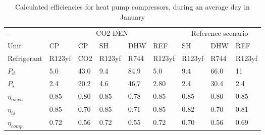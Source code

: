 \begin{table}[h!]
	\centering
	\caption{Calculated efficiencies for heat pump compressors, during an average day in January}\vspace{2mm}
	\label{tab:eta_comp} 
\begin{tabular}{l@{\hskip 0.5in}lllll@{\hskip 0.5in}lll} \toprule
	-             & \multicolumn{5}{c}{CO2 DEN}            & \multicolumn{3}{c}{Reference scenario} \\
	Unit          & CP     & CP   & SH     & DHW  & REF    & SH           & DHW       & REF         \\
	Refrigerant   & R123yf & CO2  & R123yf & R744 & R123yf & R123yf       & R744      & R123yf      \\ \midrule
	$P_{d}$       & 5.0    & 43.0 & 9.4    & 84.9 & 5.0    & 9.4          & 66.0      & 11          \\
	$P_{s}$       & 2.4    & 20.2 & 4.6    & 46.7 & 2.80   & 2.4          & 30.4      & 2.4         \\
	$\eta_{mech}$ & 0.85   & 0.80 & 0.85   & 0.78 & 0.85   & 0.85         & 0.80      & 0.85        \\
	$\eta_{is}$   & 0.85   & 0.70 & 0.85   & 0.71 & 0.85   & 0.82         & 0.70      & 0.81        \\
	$\eta_{comp}$ & 0.72   & 0.56 & 0.72   & 0.55 & 0.72   & 0.70         & 0.56      & 0.69       \\ \bottomrule
\end{tabular}
\end{table}